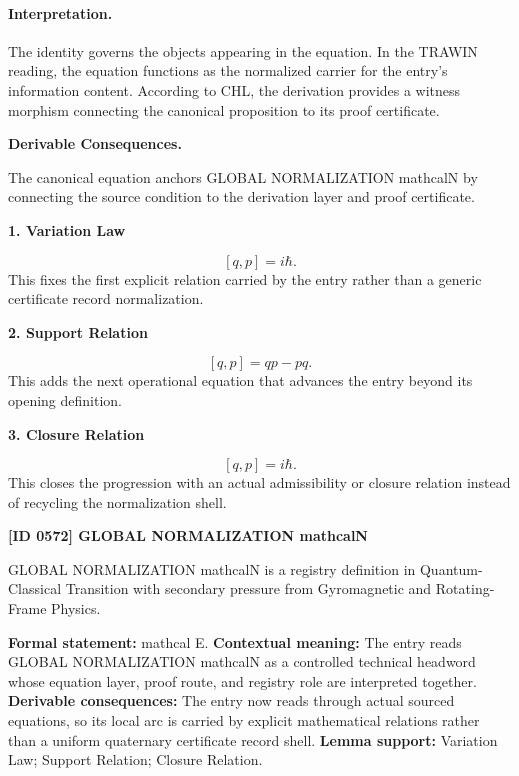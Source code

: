 \paragraph{Interpretation.}
The identity governs the objects appearing in the equation. In the TRAWIN reading, the equation functions as the normalized carrier for the entry’s information content. According to CHL, the derivation provides a witness morphism connecting the canonical proposition to its proof certificate.

\par\vspace{0.35em}
\noindent\textbf{Derivable Consequences.}\quad
\begingroup
\footnotesize
\raggedright
The canonical equation anchors GLOBAL NORMALIZATION mathcalN by connecting the source condition to the derivation layer and proof certificate.
\par\endgroup

\noindent\textbf{1. Variation Law}\par
\[
[q,p]=i\hbar.
\]
\noindent This fixes the first explicit relation carried by the entry rather than a generic certificate record normalization.\par
\noindent\textbf{2. Support Relation}\par
\[
[q,p]=qp-pq.
\]
\noindent This adds the next operational equation that advances the entry beyond its opening definition.\par
\noindent\textbf{3. Closure Relation}\par
\[
\boxed{ [q,p]=i\hbar. }
\]
\noindent This closes the progression with an actual admissibility or closure relation instead of recycling the normalization shell.\par

\clearpage
\noindent\textbf{[ID 0572] GLOBAL NORMALIZATION mathcalN}\par
\vspace{0.35em}
\begingroup\small
{}
GLOBAL NORMALIZATION mathcalN is a registry definition in Quantum-Classical Transition with secondary pressure from Gyromagnetic and Rotating-Frame Physics.

\begingroup\footnotesize\setlength{\emergencystretch}{3em}\sloppy
\textbf{Formal statement:} mathcal E. \textbf{Contextual meaning:} The entry reads GLOBAL NORMALIZATION mathcalN as a controlled technical headword whose equation layer, proof route, and registry role are interpreted together. \textbf{Derivable consequences:} The entry now reads through actual sourced equations, so its local arc is carried by explicit mathematical relations rather than a uniform quaternary certificate record shell. \textbf{Lemma support:} Variation Law; Support Relation; Closure Relation.\par
\endgroup

